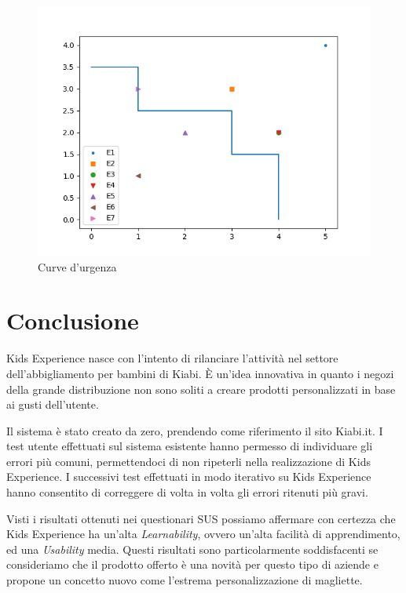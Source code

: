 \documentclass[12pt,italian,]{report}
\begin{document}
\begin{figure}[h]
\centering
\includegraphics{img/curva_urgenza.png}
\caption{Curve d'urgenza}
\end{figure}

\hypertarget{conclusione}{%
\chapter{Conclusione}\label{conclusione}}

Kids Experience nasce con l'intento di rilanciare l'attività nel settore dell'abbigliamento per bambini di Kiabi. 
È un'idea innovativa in quanto i negozi della grande distribuzione non sono soliti a creare prodotti personalizzati in base ai gusti dell'utente. 

Il sistema è stato creato da zero, prendendo come riferimento il sito Kiabi.it. 
I test utente effettuati sul sistema esistente hanno permesso di individuare gli errori più comuni, permettendoci di non ripeterli nella realizzazione di Kids Experience.
I successivi test effettuati in modo iterativo su Kids Experience hanno consentito di correggere di volta in volta gli errori ritenuti più gravi.

Visti i risultati ottenuti nei questionari SUS possiamo affermare con certezza che Kids Experience ha un'alta \emph{Learnability}, ovvero un'alta facilità di apprendimento, ed una \emph{Usability} media. Questi risultati sono particolarmente soddisfacenti se consideriamo che il prodotto offerto è una novità per questo tipo di aziende e propone un concetto nuovo come l'estrema personalizzazione di magliette.
\end{document}
